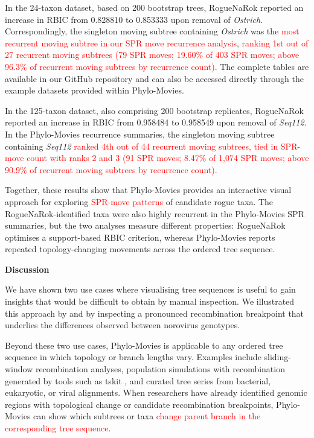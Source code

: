 In the 24-taxon dataset, based on 200 bootstrap trees, RogueNaRok reported an increase in RBIC from 0.828810 to 0.853333 upon removal of \textit{Ostrich}. Correspondingly, the singleton moving subtree containing \textit{Ostrich} was the \textcolor{red}{most recurrent moving subtree in our SPR move recurrence analysis}, \textcolor{red}{ranking 1st out of 27 recurrent moving subtrees (79 SPR moves; 19.60\% of 403 SPR moves; above 96.3\% of recurrent moving subtrees by recurrence count)}. The complete tables are available in our GitHub repository and can also be accessed directly through the example datasets provided within Phylo-Movies.

In the 125-taxon dataset, also comprising 200 bootstrap replicates, RogueNaRok reported an increase in RBIC from 0.958484 to 0.958549 upon removal of \textit{Seq112}. In the Phylo-Movies recurrence summaries, the singleton moving subtree containing \textit{Seq112} \textcolor{red}{ranked 4th out of 44 recurrent moving subtrees, tied in SPR-move count with ranks 2 and 3 (91 SPR moves; 8.47\% of 1{,}074 SPR moves; above 90.9\% of recurrent moving subtrees by recurrence count)}.

Together, these results show that Phylo-Movies provides an interactive visual approach for exploring \textcolor{red}{SPR-move patterns} of candidate rogue taxa. The RogueNaRok-identified taxa were also highly recurrent in the Phylo-Movies SPR summaries, but the two analyses measure different properties: RogueNaRok optimises a support-based RBIC criterion, whereas Phylo-Movies reports repeated topology-changing movements across the ordered tree sequence.

\textbf{Discussion} 

We have shown two use cases where visualising tree sequences is useful to gain insights that would be difficult to obtain by manual inspection. We illustrated this approach by  and by inspecting a pronounced recombination breakpoint that underlies the differences observed between norovirus genotypes.

Beyond these two use cases, Phylo-Movies is applicable to any ordered tree sequence in which topology or branch lengths vary. Examples include sliding-window recombination analyses, population simulations with recombination generated by tools such as tskit \citep{kelleher2016}, and curated tree series from bacterial, eukaryotic, or viral alignments. When researchers have already identified genomic regions with topological change or candidate recombination breakpoints, Phylo-Movies can show which subtrees or taxa \textcolor{red}{change parent branch in the corresponding tree sequence}.

